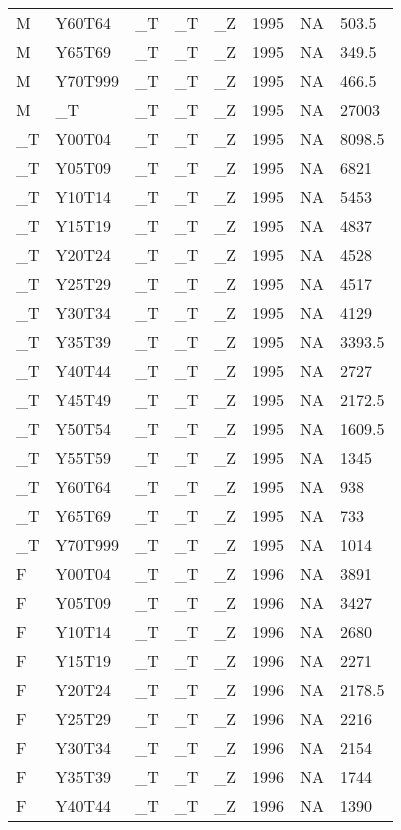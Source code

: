 \begin{longtable}[t]{llllllll}
M & Y60T64 & \_T & \_T & \_Z & 1995 & NA & 503.5\\
M & Y65T69 & \_T & \_T & \_Z & 1995 & NA & 349.5\\
M & Y70T999 & \_T & \_T & \_Z & 1995 & NA & 466.5\\
M & \_T & \_T & \_T & \_Z & 1995 & NA & 27003\\
\addlinespace
\_T & Y00T04 & \_T & \_T & \_Z & 1995 & NA & 8098.5\\
\_T & Y05T09 & \_T & \_T & \_Z & 1995 & NA & 6821\\
\_T & Y10T14 & \_T & \_T & \_Z & 1995 & NA & 5453\\
\_T & Y15T19 & \_T & \_T & \_Z & 1995 & NA & 4837\\
\_T & Y20T24 & \_T & \_T & \_Z & 1995 & NA & 4528\\
\addlinespace
\_T & Y25T29 & \_T & \_T & \_Z & 1995 & NA & 4517\\
\_T & Y30T34 & \_T & \_T & \_Z & 1995 & NA & 4129\\
\_T & Y35T39 & \_T & \_T & \_Z & 1995 & NA & 3393.5\\
\_T & Y40T44 & \_T & \_T & \_Z & 1995 & NA & 2727\\
\_T & Y45T49 & \_T & \_T & \_Z & 1995 & NA & 2172.5\\
\addlinespace
\_T & Y50T54 & \_T & \_T & \_Z & 1995 & NA & 1609.5\\
\_T & Y55T59 & \_T & \_T & \_Z & 1995 & NA & 1345\\
\_T & Y60T64 & \_T & \_T & \_Z & 1995 & NA & 938\\
\_T & Y65T69 & \_T & \_T & \_Z & 1995 & NA & 733\\
\_T & Y70T999 & \_T & \_T & \_Z & 1995 & NA & 1014\\
\addlinespace
F & Y00T04 & \_T & \_T & \_Z & 1996 & NA & 3891\\
F & Y05T09 & \_T & \_T & \_Z & 1996 & NA & 3427\\
F & Y10T14 & \_T & \_T & \_Z & 1996 & NA & 2680\\
F & Y15T19 & \_T & \_T & \_Z & 1996 & NA & 2271\\
F & Y20T24 & \_T & \_T & \_Z & 1996 & NA & 2178.5\\
\addlinespace
F & Y25T29 & \_T & \_T & \_Z & 1996 & NA & 2216\\
F & Y30T34 & \_T & \_T & \_Z & 1996 & NA & 2154\\
F & Y35T39 & \_T & \_T & \_Z & 1996 & NA & 1744\\
F & Y40T44 & \_T & \_T & \_Z & 1996 & NA & 1390\\

\end{longtable}
